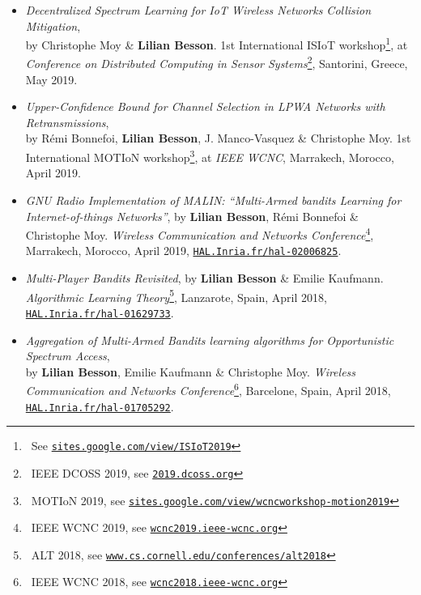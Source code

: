 \begin{itemize}

\item
    \emph{Decentralized Spectrum Learning for IoT Wireless Networks Collision Mitigation},\\
    by Christophe Moy \& \textbf{Lilian Besson}.
    1st International ISIoT workshop\footnote{~See \href{https://sites.google.com/view/ISIoT2019}{\texttt{sites.google.com/view/ISIoT2019}}},
    at \emph{Conference on Distributed Computing in Sensor Systems}\footnote{~IEEE DCOSS 2019, see \href{http://2019.dcoss.org}{\texttt{2019.dcoss.org}}}, Santorini, Greece, May 2019.
    \cite{MoyBesson2019}

\item
    \emph{Upper-Confidence Bound for Channel Selection in LPWA Networks with Retransmissions},\\
    by Rémi Bonnefoi, \textbf{Lilian Besson}, J. Manco-Vasquez \& Christophe Moy.
    1st International MOTIoN workshop\footnote{~MOTIoN 2019, see \href{https://sites.google.com/view/wcncworkshop-motion2019}{\texttt{sites.google.com/view/wcncworkshop-motion2019}}},
    at \emph{IEEE WCNC}, Marrakech, Morocco, April 2019.
    \cite{Bonnefoi2019WCNC}

\item
    \emph{GNU Radio Implementation of MALIN: ``Multi-Armed bandits Learning for Internet-of-things Networks''},
    by \textbf{Lilian Besson}, Rémi Bonnefoi \& Christophe Moy.
    \emph{Wireless Communication and Networks Conference}\footnote{~IEEE WCNC 2019, see \href{http://wcnc2019.ieee-wcnc.org}{\texttt{wcnc2019.ieee-wcnc.org}}}, Marrakech, Morocco, April 2019,
    \href{https://HAL.Inria.fr/hal-02006825}{\texttt{HAL.Inria.fr/hal-02006825}}.
    \cite{Besson2019WCNC}

\item
    \emph{Multi-Player Bandits Revisited},
    by \textbf{Lilian Besson} \& Emilie Kaufmann.
    \emph{Algorithmic Learning Theory}\footnote{~ALT 2018, see \href{http://www.cs.cornell.edu/conferences/alt2018}{\texttt{www.cs.cornell.edu/conferences/alt2018}}}, Lanzarote, Spain, April 2018,
    \href{https://HAL.Inria.fr/hal-01629733}{\texttt{HAL.Inria.fr/hal-01629733}}.
    \cite{Besson2018ALT}

\item
    \emph{Aggregation of Multi-Armed Bandits learning algorithms for Opportunistic Spectrum Access},\\
    by \textbf{Lilian Besson}, Emilie Kaufmann \& Christophe Moy.
    \emph{Wireless Communication and Networks Conference}\footnote{~IEEE WCNC 2018, see \href{http://wcnc2018.ieee-wcnc.org}{\texttt{wcnc2018.ieee-wcnc.org}}}, Barcelone, Spain, April 2018,
    \href{https://HAL.Inria.fr/hal-01705292}{\texttt{HAL.Inria.fr/hal-01705292}}.
    \cite{Besson2018WCNC}


\end{itemize}
